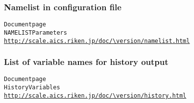 \subsubsection{Namelist in configuration file} \label{subsubsec:namelist_run}

\begin{alltt}
 \scalerm Document page
 NAMELIST Parameters
 \url{http://scale.aics.riken.jp/doc/\version/namelist.html}
\end{alltt}


\subsubsection{List of variable names for history output} \label{subsubsec:histroy_item}

\begin{alltt}
 \scalerm Document page
 History Variables
 \url{http://scale.aics.riken.jp/doc/\version/history.html}
\end{alltt}





